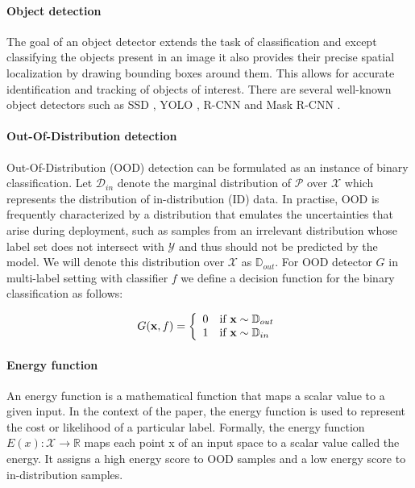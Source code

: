 \paragraph{Object detection} 
The goal of an object detector extends the task of classification and except classifying the objects present in an image it also provides their precise spatial localization by drawing bounding boxes around them. 
This allows for accurate identification and tracking of objects of interest.
There are several well-known object detectors such as SSD \cite{liuSSDSingleShot2016}, YOLO \cite{bochkovskiyYOLOv4OptimalSpeed2020}, R-CNN \cite{girshickRichFeatureHierarchies2014} and Mask R-CNN \cite{heMaskRCNN2018}. 

\paragraph{Out-Of-Distribution detection}
Out-Of-Distribution (OOD) detection can be formulated as an instance of binary classification. 
Let $\mathcal{D}_{in}$ denote the marginal distribution of $\mathcal{P}$ over $\mathcal{X}$ which represents the distribution of in-distribution (ID) data.  
In practise, OOD is frequently characterized by a distribution that emulates the uncertainties that arise during deployment, 
such as samples from an irrelevant distribution whose label set does not intersect with $\mathcal{Y}$ and thus should not be predicted by the model. 
We will denote this distribution over $\mathcal{X}$  as $\mathbb{D}_{out}$. 
For OOD detector $G$ in multi-label setting with classifier $f$ we define a decision function for the binary classification as follows:

\begin{equation}
\centering
G(\mathbf{x}, f) =
\left\{
	\begin{array}{ll}
	    0  & \mbox{if } \mathbf{x} \sim \mathbb{D}_{out} \\
		1  & \mbox{if } \mathbf{x} \sim \mathbb{D}_{in} 
	\end{array}
\right.
\end{equation}

\paragraph{Energy function}\label{energy}
An energy function is a mathematical function that maps a scalar value to a given input. 
In the context of the paper, the energy function is used to represent the cost or likelihood of a particular label. 
Formally, the energy function 
$E(x) : \mathcal{X} \rightarrow \mathbb{R}$ maps each point x of an input space to a scalar value called the energy.
It assigns a high energy score to OOD samples and a low energy score to in-distribution samples. 

